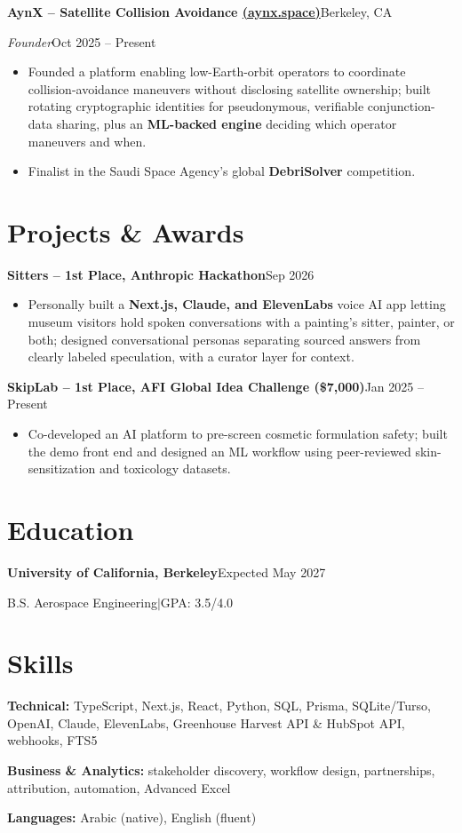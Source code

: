 \documentclass[a4paper,10pt]{article}
\newcommand{\entry}[4]{%
  \textbf{#1}\hfill #2\par
  \textit{#3}\hfill #4\par
}
\newcommand{\project}[2]{\textbf{#1}\hfill #2\par}
\begin{document}
\entry{AynX -- Satellite Collision Avoidance \;\href{https://aynx.space}{(aynx.space)}}{Berkeley, CA}
{Founder}{Oct 2025 -- Present}
\begin{itemize}
  \item Founded a platform enabling low-Earth-orbit operators to coordinate collision-avoidance maneuvers without disclosing satellite ownership; built rotating cryptographic identities for pseudonymous, verifiable conjunction-data sharing, plus an \textbf{ML-backed engine} deciding which operator maneuvers and when.
  \item Finalist in the Saudi Space Agency's global \textbf{DebriSolver} competition.
\end{itemize}
\section{Projects \& Awards}
\project{Sitters -- 1st Place, Anthropic Hackathon}{Sep 2026}
\begin{itemize}
  \item Personally built a \textbf{Next.js, Claude, and ElevenLabs} voice AI app letting museum visitors hold spoken conversations with a painting's sitter, painter, or both; designed conversational personas separating sourced answers from clearly labeled speculation, with a curator layer for context.
\end{itemize}
\project{SkipLab -- 1st Place, AFI Global Idea Challenge (\$7,000)}{Jan 2025 -- Present}
\begin{itemize}
  \item Co-developed an AI platform to pre-screen cosmetic formulation safety; built the demo front end and designed an ML workflow using peer-reviewed skin-sensitization and toxicology datasets.
\end{itemize}
\section{Education}
\textbf{University of California, Berkeley}\hfill Expected May 2027\par
B.S. Aerospace Engineering\enspace$|$\enspace GPA: 3.5/4.0\par

\section{Skills}
\textbf{Technical:} TypeScript, Next.js, React, Python, SQL, Prisma, SQLite/Turso, OpenAI, Claude, ElevenLabs, Greenhouse Harvest API \& HubSpot API, webhooks, FTS5\par
\textbf{Business \& Analytics:} stakeholder discovery, workflow design, partnerships, attribution, automation, Advanced Excel\par
\textbf{Languages:} Arabic (native), English (fluent)
\end{document}
